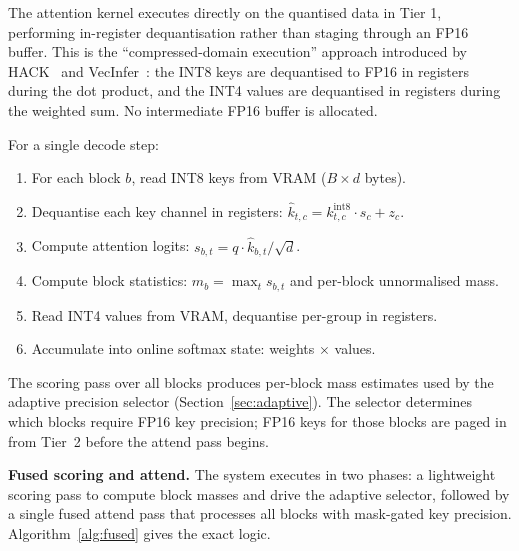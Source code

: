 \documentclass[11pt,a4paper]{article}
\theoremstyle{definition}
\theoremstyle{remark}
\begin{document}
The attention kernel executes directly on the quantised data in Tier 1, performing in-register dequantisation rather than staging through an FP16 buffer.  This is the ``compressed-domain execution'' approach introduced by HACK~\cite{hack} and VecInfer~\cite{vecinfer}: the INT8 keys are dequantised to FP16 in registers during the dot product, and the INT4 values are dequantised in registers during the weighted sum.  No intermediate FP16 buffer is allocated.

For a single decode step:
\begin{enumerate}[leftmargin=2em,itemsep=2pt]
  \item For each block $b$, read INT8 keys from VRAM ($B \times d$ bytes).
  \item Dequantise each key channel in registers: $\hat{k}_{t,c} = k_{t,c}^{\mathrm{int8}} \cdot s_c + z_c$.
  \item Compute attention logits: $s_{b,t} = q \cdot \hat{k}_{b,t} / \sqrt{d}$.
  \item Compute block statistics: $m_b = \max_t s_{b,t}$ and per-block unnormalised mass.
  \item Read INT4 values from VRAM, dequantise per-group in registers.
  \item Accumulate into online softmax state: weights $\times$ values.
\end{enumerate}

The scoring pass over all blocks produces per-block mass estimates used by the adaptive precision selector (Section~\ref{sec:adaptive}).  The selector determines which blocks require FP16 key precision; FP16 keys for those blocks are paged in from Tier~2 before the attend pass begins.

\textbf{Fused scoring and attend.}  The system executes in two phases: a lightweight scoring pass to compute block masses and drive the adaptive selector, followed by a single fused attend pass that processes all blocks with mask-gated key precision.  Algorithm~\ref{alg:fused} gives the exact logic.
\end{document}
